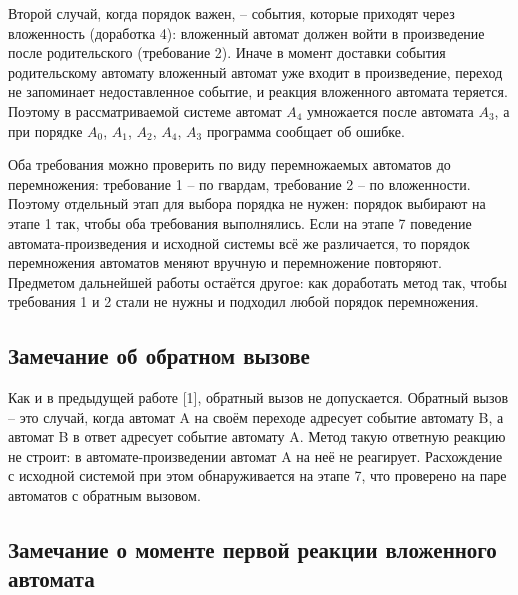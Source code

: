 \documentclass[12pt]{article}
\begin{document}
Второй случай, когда порядок важен, – события, которые приходят через вложенность (доработка 4): вложенный автомат должен войти в произведение после родительского (требование 2). Иначе в момент доставки события родительскому автомату вложенный автомат уже входит в произведение, переход не запоминает недоставленное событие, и реакция вложенного автомата теряется. Поэтому в рассматриваемой системе автомат $A_{4}$ умножается после автомата $A_{3}$, а при порядке $A_{0}$, $A_{1}$, $A_{2}$, $A_{4}$, $A_{3}$ программа сообщает об ошибке.

Оба требования можно проверить по виду перемножаемых автоматов до перемножения: требование 1 – по гвардам, требование 2 – по вложенности. Поэтому отдельный этап для выбора порядка не нужен: порядок выбирают на этапе 1 так, чтобы оба требования выполнялись. Если на этапе 7 поведение автомата-произведения и исходной системы всё же различается, то порядок перемножения автоматов меняют вручную и перемножение повторяют. Предметом дальнейшей работы остаётся другое: как доработать метод так, чтобы требования 1 и 2 стали не нужны и подходил любой порядок перемножения.

\subsection*{Замечание об обратном вызове}

Как и в предыдущей работе [1], обратный вызов не допускается. Обратный вызов – это случай, когда автомат A на своём переходе адресует событие автомату B, а автомат B в ответ адресует событие автомату A. Метод такую ответную реакцию не строит: в автомате-произведении автомат A на неё не реагирует. Расхождение с исходной системой при этом обнаруживается на этапе 7, что проверено на паре автоматов с обратным вызовом.

\subsection*{Замечание о моменте первой реакции вложенного автомата}
\end{document}
